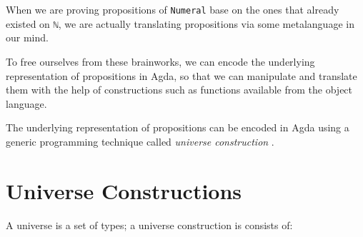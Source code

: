 \documentclass[\main/thesis.tex]{subfiles}
\begin{document}
When we are proving propositions of \lstinline|Numeral| base on the ones that
already existed on \lstinline|ℕ|, we are actually translating propositions via
some metalanguage in our mind.

To free ourselves from these brainworks, we can encode the
underlying representation of propositions in Agda,
so that we can manipulate and translate them with the
help of constructions such as functions available from the object language.

\begin{center}
    \begin{adjustbox}{max width=\textwidth}
    \end{adjustbox}
\end{center}

The underlying representation of propositions can be encoded in Agda
using a generic programming technique called \textit{universe construction}
\cite{norell2009dependently}.

\section{Universe Constructions}

A universe is a set of types;
a universe construction is consists of:
\end{document}
